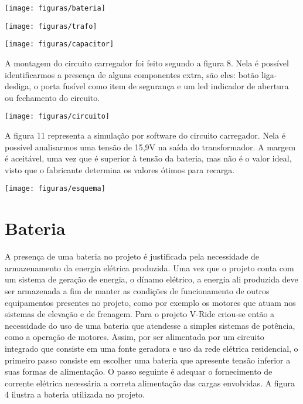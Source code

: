                                \begin{center}
    	\texttt{[image: figuras/bateria]}
        \label{bateria}
    \end{center}

 \begin{center}
    	\texttt{[image: figuras/trafo]}
        \label{trafo}
    \end{center}


                            \begin{center}
    	\texttt{[image: figuras/capacitor]}
        \label{capacitor}
    \end{center}


A montagem do circuito carregador foi feito segundo a figura 8. Nela é possível identificarmos a presença de alguns componentes extra, são eles: botão liga-desliga, o porta fusível como item de segurança  e um led indicador de abertura ou fechamento do circuito.


      \begin{center}
    	\texttt{[image: figuras/circuito]}
        \label{circuito}
    \end{center}
A figura 11 representa a simulação por software do circuito carregador. Nela é possível analisarmos uma tensão de 15,9V na saída do transformador. A margem é aceitável, uma vez que é superior à tensão da bateria, mas não é o valor ideal, visto que o fabricante determina os valores ótimos para recarga.


 \begin{center}
    	\texttt{[image: figuras/esquema]}
        \label{esquema}
    \end{center}
    \section{Bateria}
A presença de uma bateria no projeto é justificada pela necessidade de armazenamento da energia elétrica produzida. Uma vez que o projeto conta com um sistema de geração de energia, o dínamo elétrico, a energia ali produzida deve ser armazenada a fim de manter as condições de funcionamento de outros equipamentos presentes no projeto, como por exemplo os motores que atuam nos sistemas de elevação e de frenagem.
 Para o projeto V-Ride criou-se então a necessidade do uso de uma bateria que atendesse a simples sistemas de potência, como a operação de motores. Assim, por ser alimentada por um circuito integrado que consiste em uma fonte geradora e uso da rede elétrica residencial, o primeiro passo consiste em escolher uma bateria que apresente tensão inferior a suas formas de alimentação. O passo seguinte é adequar o fornecimento de corrente elétrica necessária a correta alimentação das cargas envolvidas. A figura 4 ilustra a bateria utilizada no projeto.


